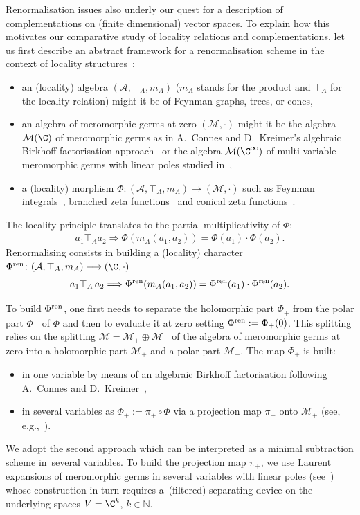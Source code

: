 \documentclass[pdftex]{sigma}
\numberwithin{equation}{section}
\newcommand{\N}{\mathbb{N}}
\begin{document}
Renormalisation issues also underly our quest for a description of complementations on (finite dimensional) vector spaces. To explain how this motivates our comparative study of locality relations and complementations, let us first describe an abstract framework for a renormalisation scheme in the context of locality structures~\cite{CGPZ1, CGPZ2}:
\begin{itemize}\itemsep=0pt
\item an (locality) algebra $ \left({\mathcal A}, \top_A, m_A\right)$ ($m_A$ stands for the product and $\top_A$ for the locality relation) might it be of Feynman graphs, trees, or cones,
\item an algebra of meromorphic germs at zero $\left({ {\mathcal M} } , \cdot\right)$ might it be the algebra ${\mathcal M}(\C)$ of meromorphic germs as in A.~Connes and D.~Kreimer's algebraic Birkhoff factorisation approach~\cite{CK} or the algebra ${\mathcal M}(\C^\infty)$ of multi-variable meromorphic germs with linear poles studied in~\cite{GPZ2},
\item a (locality) morphism $ \Phi\colon ({\mathcal A}, \top_A, m_A)
\longrightarrow({\mathcal M}, \cdot)$ such as Feynman integrals~\cite{DZ}, branched zeta functions~\cite{CGPZ3, CGPZ4} and conical zeta functions~\cite{GPZ1}.
		\end{itemize}
The locality principle translates to the partial multiplicativity of $\Phi$:
\begin{gather*}
a_1 \top_A a_2\Longrightarrow \Phi(m_A(a_1 ,a_2))= \Phi (a_1) \cdot \Phi(a_2).
\end{gather*}
Renormalising consists in building a (locality) character $\Phi^{\rm ren}\colon ({\mathcal A}, \top_A, m_A)\longrightarrow (\C, \cdot)$
%
\begin{gather*}
a_1 \top_A\, a_2\Longrightarrow \Phi^{ \rm ren}({ m_A}( a_1 ,a_2))= { \Phi}^{ \rm ren} ( a_1 ) \cdot{ \Phi}^{\rm ren}(a_2).
\end{gather*}
	

 To build $ \Phi^{ \rm ren} $, one first needs to separate the holomorphic part ${ \Phi}_+$ from the polar part ${ \Phi}_-$ of ${ \Phi}$ and then to evaluate it at zero setting $\Phi^{\rm ren}:= \Phi_+(0)$. This splitting relies on the splitting $ {\mathcal M} = {\mathcal M}_+\oplus {\mathcal M}_-$ of the algebra of meromorphic germs at zero into a holomorphic part $ {\mathcal M}_+$ and a polar part ${\mathcal M}_-$. The map $\Phi_+$ is built:
\begin{itemize}\itemsep=0pt
\item in one variable by means of an algebraic Birkhoff factorisation following A.~Connes and
D.~Kreimer~\cite{CK},
\item in several variables as $\Phi_+:=\pi_+\circ \Phi$ via a projection map $\pi_+$ onto
${\mathcal M}_+$ (see, e.g.,~\cite{CGPZ2}).
\end{itemize}
			We adopt the second approach which can be interpreted as a minimal subtraction scheme in~several variables. To build the projection map $\pi_+$, we use Laurent expansions of meromorphic germs in several variables with linear poles (see~\cite{GPZ2}) whose construction in turn requires a~(filtered) separating device on the underlying spaces $V=\C^k$, $k\in \N$.
			
\end{document}
